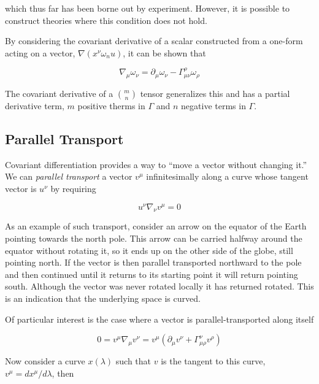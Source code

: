 which thus far has been borne out by experiment.  However, it is
possible to construct theories where this condition does not hold.

By considering the covariant derivative of a scalar constructed from a
one-form acting on a vector, $\nabla (x^\nu \omega_nu)$, it can be shown
that

\begin{equation*}
\nabla_\mu \omega_\nu = \partial_\mu \omega_\nu - 
\Gamma^\rho_{\mu\nu} \omega_\rho
\end{equation*}

The covariant derivative of a ${m \choose n}$ tensor generalizes this
and has a partial derivative term, $m$ positive therms in $\Gamma$ and
$n$ negative terms in $\Gamma$.

\subsection{Parallel Transport}
\label{ssec:parallel}

Covariant differentiation provides a way to ``move a vector without
changing it.''  We can \emph{parallel transport} a vector $v^\mu$
infinitesimally along a curve whose tangent vector is $u^\nu$ by
requiring

\begin{equation*}
u^\nu \nabla_\nu v^\mu = 0
\end{equation*}

As an example of such transport, consider an arrow on the equator of
the Earth pointing towards the north pole.  This arrow can be carried
halfway around the equator without rotating it, so it ends up on the
other side of the globe, still pointing north.  If the vector is then
parallel transported northward to the pole and then continued until it
returns to its starting point it will return pointing south.  Although
the vector was never rotated locally it has returned rotated.  This is
an indication that the underlying space is curved.

Of particular interest is the case where a vector is
parallel-transported along itself

\begin{equation*}
0 = v^\mu \nabla_\mu v^\nu 
= v^\mu (\partial_\mu v^\nu + \Gamma^\nu_{\mu\rho} v^\rho)
\end{equation*}

Now consider a curve $x(\lambda)$ such that $v$ is the tangent to this
curve, $v^\mu = d x^\mu/d\lambda$, then

